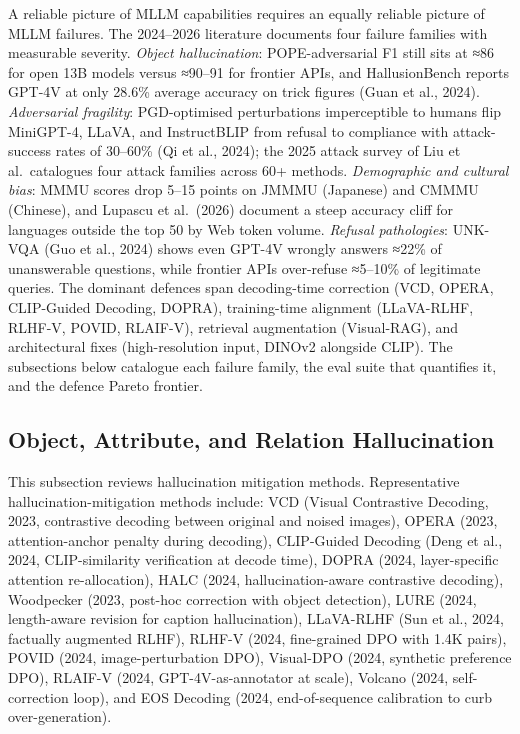 A reliable picture of MLLM capabilities requires an equally reliable picture of MLLM failures. The 2024--2026 literature documents four failure families with measurable severity. \emph{Object hallucination}: POPE-adversarial F1 still sits at ≈86 for open 13B models versus ≈90--91 for frontier APIs, and HallusionBench reports GPT-4V at only 28.6\% average accuracy on trick figures (Guan et al., 2024). \emph{Adversarial fragility}: PGD-optimised perturbations imperceptible to humans flip MiniGPT-4, LLaVA, and InstructBLIP from refusal to compliance with attack-success rates of 30--60\% (Qi et al., 2024); the 2025 attack survey of Liu et al.~catalogues four attack families across 60+ methods. \emph{Demographic and cultural bias}: MMMU scores drop 5--15 points on JMMMU (Japanese) and CMMMU (Chinese), and Lupascu et al.~(2026) document a steep accuracy cliff for languages outside the top 50 by Web token volume. \emph{Refusal pathologies}: UNK-VQA (Guo et al., 2024) shows even GPT-4V wrongly answers ≈22\% of unanswerable questions, while frontier APIs over-refuse ≈5--10\% of legitimate queries. The dominant defences span decoding-time correction (VCD, OPERA, CLIP-Guided Decoding, DOPRA), training-time alignment (LLaVA-RLHF, RLHF-V, POVID, RLAIF-V), retrieval augmentation (Visual-RAG), and architectural fixes (high-resolution input, DINOv2 alongside CLIP). The subsections below catalogue each failure family, the eval suite that quantifies it, and the defence Pareto frontier.

\subsection{Object, Attribute, and Relation Hallucination}\label{object-attribute-and-relation-hallucination}

This subsection reviews hallucination mitigation methods. Representative hallucination-mitigation methods include: VCD (Visual Contrastive Decoding, 2023, contrastive decoding between original and noised images), OPERA (2023, attention-anchor penalty during decoding), CLIP-Guided Decoding (Deng et al., 2024, CLIP-similarity verification at decode time), DOPRA (2024, layer-specific attention re-allocation), HALC (2024, hallucination-aware contrastive decoding), Woodpecker (2023, post-hoc correction with object detection), LURE (2024, length-aware revision for caption hallucination), LLaVA-RLHF (Sun et al., 2024, factually augmented RLHF), RLHF-V (2024, fine-grained DPO with 1.4K pairs), POVID (2024, image-perturbation DPO), Visual-DPO (2024, synthetic preference DPO), RLAIF-V (2024, GPT-4V-as-annotator at scale), Volcano (2024, self-correction loop), and EOS Decoding (2024, end-of-sequence calibration to curb over-generation).

